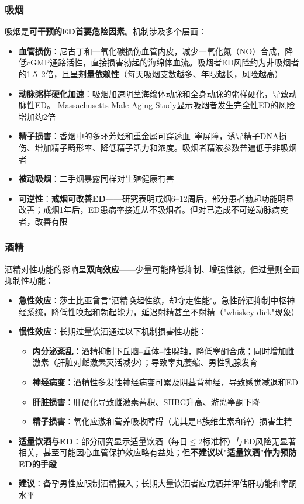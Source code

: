 \subsubsection{吸烟}

吸烟是\textbf{可干预的ED首要危险因素}。机制涉及多个层面：

\begin{itemize}[leftmargin=2cm]
	\item \textbf{血管损伤}：尼古丁和一氧化碳损伤血管内皮，减少一氧化氮（NO）合成，降低cGMP通路活性，直接损害勃起的海绵体血流。吸烟者ED风险约为非吸烟者的1.5--2倍，且呈\textbf{剂量依赖性}（每天吸烟支数越多、年限越长，风险越高）
	\item \textbf{动脉粥样硬化加速}：吸烟加速阴茎海绵体动脉和全身动脉的粥样硬化，导致动脉性ED。 Massachusetts Male Aging Study显示吸烟者发生完全性ED的风险增加约2倍
	\item \textbf{精子损害}：香烟中的多环芳烃和重金属可穿透血--睾屏障，诱导精子DNA损伤、增加精子畸形率、降低精子活力和浓度。吸烟者精液参数普遍低于非吸烟者
	\item \textbf{被动吸烟}：二手烟暴露同样对生殖健康有害
	\item \textbf{可逆性}：\textbf{戒烟可改善ED}——研究表明戒烟6--12周后，部分患者勃起功能明显改善；戒烟1年后，ED患病率接近从不吸烟者。但对已造成不可逆动脉病变者，改善有限
\end{itemize}

\subsubsection{酒精}

酒精对性功能的影响呈\textbf{双向效应}——少量可能降低抑制、增强性欲，但过量则全面抑制性功能：

\begin{itemize}[leftmargin=2cm]
	\item \textbf{急性效应}：莎士比亚曾言"酒精唤起性欲，却夺走性能"。急性醉酒抑制中枢神经系统，降低性唤起和勃起能力，延迟射精甚至不射精（"whiskey dick"现象）
	\item \textbf{慢性效应}：长期过量饮酒通过以下机制损害性功能：
    \begin{itemize}
    	\item \textbf{内分泌紊乱}：酒精抑制下丘脑--垂体--性腺轴，降低睾酮合成；同时增加雌激素（肝脏对雌激素灭活减少）；导致睾丸萎缩、男性乳腺发育
    	\item \textbf{神经病变}：酒精性多发性神经病变可累及阴茎背神经，导致感觉减退和ED
    	\item \textbf{肝脏损害}：肝硬化导致雌激素蓄积、SHBG升高、游离睾酮下降
    	\item \textbf{精子损害}：氧化应激和营养吸收障碍（尤其是B族维生素和锌）损害生精
    \end{itemize}
	\item \textbf{适量饮酒与ED}：部分研究显示适量饮酒（每日$\le$2标准杯）与ED风险无显著相关，甚至可能因心血管保护效应略有益处；但\textbf{不建议以"适量饮酒"作为预防ED的手段}
	\item \textbf{建议}：备孕男性应限制酒精摄入；长期大量饮酒者应戒酒并评估肝功能和睾酮水平
\end{itemize}

